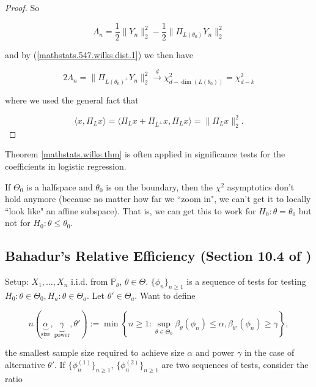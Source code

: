 \begin{proof}
So

\[
\Lambda_n =  \frac{1}{2} \lVert Y_n \rVert_2^2 - \frac{1}{2} \lVert \Pi_{L(\theta_0)} Y_n \rVert_2^2
\]

and by (\ref{mathstats.547.wilks.dist.1}) we then have 

\[
2 \Lambda_n = \lVert \Pi_{L(\theta_0)^{\perp}} Y_n \rVert_2^2 \xrightarrow{d} \chi_{d-\operatorname{dim}(L(\theta_0))}^2 = \chi_{d-k}^2
\]

where we used the general fact that 

\[
\langle x, \Pi_L x \rangle = \langle \Pi_L x + \Pi_{L^\perp} x, \Pi_L x \rangle = \lVert \Pi_L x \rVert_2^2.
\]

\end{proof}

\begin{remark}

Theorem \ref{mathstats.wilks.thm} is often applied in significance tests for the coefficients in logistic regression.

\end{remark}

\begin{remark}

If \(\Theta_0\) is a halfspace and \(\theta_0\) is on the boundary, then the \(\chi^2\) asymptotics don't hold anymore (because no matter how far we ``zoom in", we can't get it to locally ``look like" an affine subspace). That is, we can get this to work for \(H_0: \theta = \theta_0\) but not for \(H_0: \theta \leq \theta_0\). 

\end{remark}

\subsection{Bahadur's Relative Efficiency (Section 10.4 of \citet{serfling1980})}

Setup: \(X_1, \ldots, X_n\) i.i.d. from \(\mathbb{P}_\theta\), \(\theta \in \Theta\). \(\{\phi_n\}_{n \geq 1}\)  is a sequence of tests for testing \(H_0: \theta \in \Theta_0, H_a: \theta \in \Theta_a\). Let \(\theta' \in \Theta_a\). Want to define

\[
n(\underbrace{\alpha}_{\text{size}}, \underbrace{\gamma}_{\text{power}}, \theta') := \min \left\{ n \geq 1: \sup_{\theta \in \Theta_0} \beta_\theta(\phi_n)  \leq \alpha, \beta_{\theta'}(\phi_n) \geq \gamma \right\},
\]

the smallest sample size required to achieve size \(\alpha\) and power \(\gamma\) in the case of alternative \(\theta'\). If \(\{\phi_n^{(1)}\}_{n \geq 1}\), \(\{\phi_n^{(2)}\}_{n \geq 1}\) are two sequences of tests, consider the ratio 

